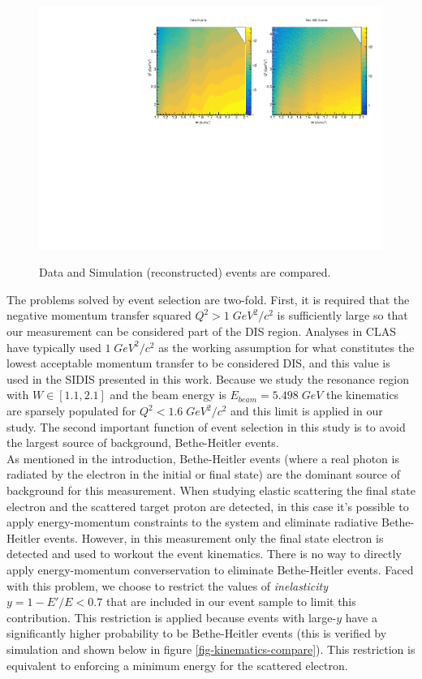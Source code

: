\begin{figure}
	\centering
	\includegraphics[width=\textwidth]{image/plots/inclusive/w_qq.pdf}
	\label{fig:wqq-data-sim}
	\caption[Inclusive data and simulation comparison.]{Data and Simulation (reconstructed) events are compared.}
\end{figure}

The problems solved by event selection are two-fold.  First, it is required that the negative momentum transfer squared $Q^2 > 1 \; GeV^2/c^2$ is sufficiently large so that our measurement can be considered part of the DIS region.  Analyses in CLAS have typically used $1 \; GeV^2/c^2$ as the working assumption for what constitutes the lowest acceptable momentum transfer to be considered DIS, and this value is used in the SIDIS presented in this work.  Because we study the resonance region with $W \in [1.1, 2.1]$ and the beam energy is $E_{beam} = 5.498 \; GeV$ the kinematics are sparsely populated for $Q^2 < 1.6 \; GeV^2/c^2$ and this limit is applied in our study.  The second important function of event selection in this study is to avoid the largest source of background, Bethe-Heitler events. \\

As mentioned in the introduction, Bethe-Heitler events (where a real photon is radiated by the electron in the initial or final state) are the dominant source of background for this measurement.  When studying elastic scattering the final state electron and the scattered target proton are detected, in this case it's possible to apply energy-momentum constraints to the system and eliminate radiative Bethe-Heitler events.  However, in this measurement only the final state electron is detected and used to workout the event kinematics.  There is no way to directly apply energy-momentum converservation to eliminate Bethe-Heitler events.  Faced with this problem, we choose to restrict the values of \textit{inelasticity} $y = 1-E'/E < 0.7$ that are included in our event sample to limit this contribution.  This restriction is applied because events with large-$y$ have a significantly higher probability to be Bethe-Heitler events (this is verified by simulation and shown below in figure \ref{fig-kinematics-compare}).  This restriction is equivalent to enforcing a minimum energy for the scattered electron.


